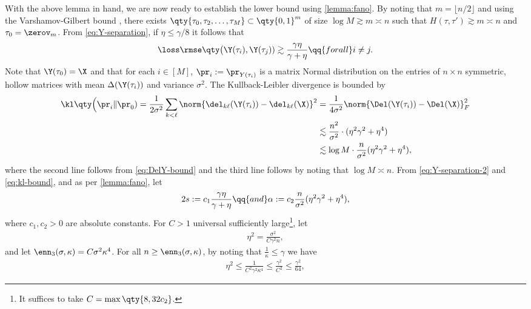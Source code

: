 \documentclass[10pt]{article}
\begin{document}
With the above lemma in hand, we are now ready to establish the lower bound using \cref{lemma:fano}. 
By noting that $m = \lfloor n/2 \rfloor$ and using the Varshamov-Gilbert bound \citep[Lemma~2.9]{tsybakov2008nonparametric}, there exists $\qty{\tau_0, \tau_2, \dots, \tau_M} \subset \qty{0, 1}^m$ of size $\log{M} \gtrsim m \asymp n$ such that $H(\tau, \tau') \gtrsim m \asymp n$ and $\tau_0 = \zerov_m$. From \ref{eq:Y-separation}, if $\eta \le \gamma/8$ it follows that
\begin{align}
    \loss\rmse\qty\big(\Y(\tau_i), \Y(\tau_j)) \gtrsim \frac{\gamma\eta}{\gamma + \eta} \qq{for all} i \neq j.\label{eq:Y-separation-2}
\end{align}
Note that $\Y(\tau_0) = \X$ and that for each $i \in [M]$, $\pr_{i} := \pr_{Y(\tau_i)}$ is a matrix Normal distribution on the entries of $n \times n$ symmetric, hollow matrices with mean $\Delta(\Y(\tau_i))$ and variance $\sigma^2$. The Kullback-Leibler divergence is bounded by
\begin{align}
    \kl\qty\Big( \pr_{i} \| \pr_{0} ) = \frac{1}{2\sigma^2}\sum_{k < \ell}\norm{ \del_{k\ell}(\Y(\tau_i)) -  \del_{k\ell}(\X) }^2 
    &= \frac{1}{4\sigma^2} \norm{\Del(\Y(\tau_i)) - \Del(\X)}^2_F\\ 
    &\lesssim \frac{n^2}{\sigma^2}\cdot (\eta^2\gamma^2 + \eta^4)\\
    &\lesssim \log{M} \cdot \frac{n}{\sigma^2}(\eta^2\gamma^2 + \eta^4),\label{eq:kl-bound}
\end{align}
where the second line follows from \ref{eq:DelY-bound} and the third line follows by noting that $\log{M} \asymp n$. From \cref{eq:Y-separation-2} and \cref{eq:kl-bound}, and as per \cref{lemma:fano}, let
\begin{align}
    2s := c_1\frac{\gamma\eta}{\gamma + \eta} \qq{and} \alpha := c_2\frac{n}{\sigma^2}(\eta^2\gamma^2 + \eta^4),
\end{align}
where $c_1, c_2 > 0$ are absolute constants. For $C > 1$ universal sufficiently large\footnote{It suffices to take $C=\max\qty{8, 32c_2}$.}, let
\begin{align}
    \eta^2 = \frac{\sigma^2}{C \gamma^2n},
\end{align}
and let $\enn_3(\sigma, \kappa) = C\sigma^2\kappa^4$. For all $n \ge \enn_3(\sigma, \kappa)$, by noting that $\frac{1}{\kappa} \le \gamma$ we have
\begin{align}
    \eta^2 \le \frac{1}{C^2\gamma^2\kappa^4} \le \frac{\gamma^2}{C^2} \le \frac{\gamma^2}{64},
\end{align}
\end{document}
